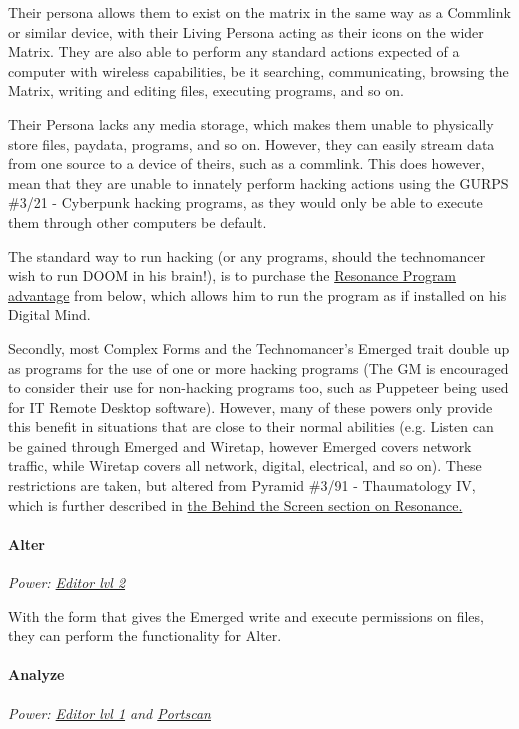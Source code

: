 \begin{multicols*}{3}
	Their persona allows them to exist on the matrix in the same way as a Commlink or similar device, with their Living Persona acting as their icons on the wider Matrix. They are also able to perform any standard actions expected of a computer with wireless capabilities, be it searching, communicating, browsing the Matrix, writing and editing files, executing programs, and so on. 
	
	Their Persona lacks any media storage, which makes them unable to physically store files, paydata, programs, and so on. However, they can easily stream data from one source to a device of theirs, such as a commlink. This does however, mean that they are unable to innately perform hacking actions using the GURPS \#3/21 - Cyberpunk hacking programs, as they would only be able to execute them through other computers be default.
	
	The standard way to run hacking (or any programs, should the technomancer wish to run DOOM in his brain!), is to purchase the \hyperref[resonance_program]{Resonance Program advantage} from below, which allows him to run the program as if installed on his Digital Mind.
	
	Secondly, most Complex Forms and the Technomancer's Emerged trait double up as programs for the use of one or more hacking programs (The GM is encouraged to consider their use for non-hacking programs too, such as Puppeteer being used for IT Remote Desktop software). However, many of these powers only provide this benefit in situations that are close to their normal abilities (e.g. Listen can be gained through Emerged and Wiretap, however Emerged covers network traffic, while Wiretap covers all network, digital, electrical, and so on). These restrictions are taken, but altered from Pyramid \#3/91 - Thaumatology IV, which is further described in \hyperref[behind_the_screen]{the Behind the Screen section on Resonance.}
	
	\paragraph{Alter}
	\begin{center}
		\textit{Power: \hyperref[editor]{Editor lvl 2}}
	\end{center}

	With the form that gives the Emerged write and execute permissions on files, they can perform the functionality for Alter.

	\paragraph{Analyze}
	\begin{center}
		\textit{Power: \hyperref[editor]{Editor lvl 1} and \hyperref[portscan]{Portscan}}
	\end{center}


\end{multicols*}
